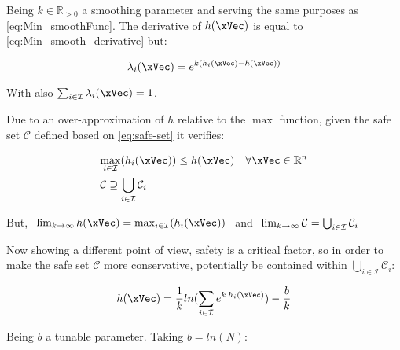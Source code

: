 \begin{description}
    Being \(k \in \mathbb{R}_{>0}\) a smoothing parameter and serving the same purposes as \ref{eq:Min_smoothFunc}. The derivative of \(h(\xVec)\) is equal to \ref{eq:Min_smooth_derivative} but:

    \begin{equation}
        \lambda_i(\xVec) = e^{k(h_i(\xVec)-h(\xVec))}
        \label{eq:Max_lambda_smoothFunc}
    \end{equation}

    With also \(\sum_{i \in \mathcal{I}} \lambda_i(\xVec) = 1\). \par
    Due to an over-approximation of \(h\) relative to the \(\max\) function, given the safe set \(\mathcal{C}\) defined based on \ref{eq:safe-set} it verifies:

    \begin{subequations}
        \begin{align}
            &\underset{i \in \mathcal{I}}{\max} (h_i(\xVec)) \leq h(\xVec) \quad \forall \xVec \in \mathbb{R}^n 
            \label{eq:Union_CBF_Comparation} \\
            &\mathcal{C} \supseteq \bigcup_{i \in \mathcal{I}} \mathcal{C}_i
            \label{eq:Union_SafeSet_Comparation}
        \end{align}
    \end{subequations}

    But, \(\hspace{0.4em} \lim_{k \to \infty} h(\xVec) = {\max}_{i \in \mathcal{I}} (h_i(\xVec)) \hspace{0.4em}\) and \( \hspace{0.4em} \lim_{k \to \infty} \mathcal{C} = \bigcup_{i \in \mathcal{I}} \mathcal{C}_i\) \par

    Now showing a different point of view, safety is a critical factor, so in order to make the safe set \(\mathcal{C}\) more conservative, potentially be contained within \( \bigcup_{i \in \mathcal{I}} \mathcal{C}_i\): 
    
    \begin{equation}
        h(\xVec) = \frac{1}{k}ln(\sum_{i \in \mathcal{I}} e^{k \hspace{0.2em} h_i(\xVec)}) - \frac{b}{k}
        \label{eq:Max_smoothFunc_tighted} \\  
    \end{equation}

    Being  \(b\) a tunable parameter. Taking \(b = ln (N)\):


\end{description}
